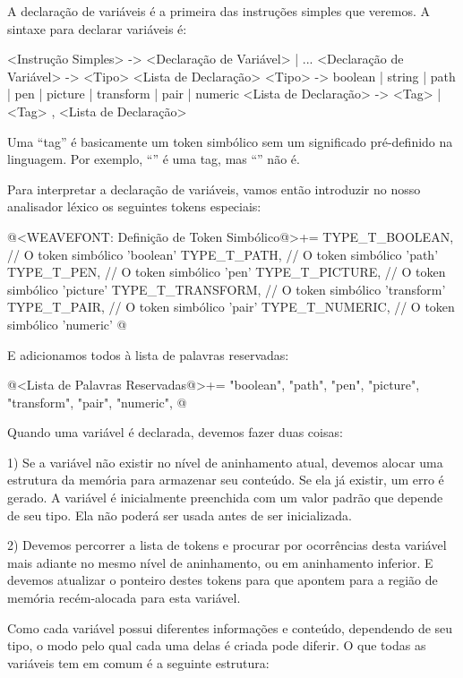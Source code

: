 
A declaração de variáveis é a primeira das instruções simples que
veremos. A sintaxe para declarar variáveis é:

\alinhaverbatim
<Instrução Simples> -> <Declaração de Variável> | ...
<Declaração de Variável> -> <Tipo> <Lista de Declaração>
<Tipo> -> boolean | string | path | pen | picture | transform | pair |
          numeric
<Lista de Declaração> -> <Tag> | <Tag> , <Lista de Declaração>
\alinhanormal

Uma ``tag'' é basicamente um token simbólico sem um significado
pré-definido na linguagem. Por exemplo, ``'' é uma tag,
mas ``'' não é.

Para interpretar a declaração de variáveis, vamos então introduzir no
nosso analisador léxico os seguintes tokens especiais:

\iniciocodigo
@<WEAVEFONT: Definição de Token Simbólico@>+=
TYPE_T_BOOLEAN,               // O token simbólico 'boolean'
TYPE_T_PATH,                  // O token simbólico 'path'
TYPE_T_PEN,                   // O token simbólico 'pen'
TYPE_T_PICTURE,               // O token simbólico 'picture'
TYPE_T_TRANSFORM,             // O token simbólico 'transform'
TYPE_T_PAIR,                  // O token simbólico 'pair'
TYPE_T_NUMERIC,               // O token simbólico 'numeric'
@
\fimcodigo

E adicionamos todos à lista de palavras reservadas:

\iniciocodigo
@<Lista de Palavras Reservadas@>+=
"boolean", "path", "pen", "picture", "transform", "pair", "numeric",
@
\fimcodigo

Quando uma variável é declarada, devemos fazer duas coisas:

1) Se a variável não existir no nível de aninhamento atual, devemos
alocar uma estrutura da memória para armazenar seu conteúdo. Se ela já
existir, um erro é gerado. A variável é inicialmente preenchida com um
valor padrão que depende de seu tipo. Ela não poderá ser usada antes
de ser inicializada.

2) Devemos percorrer a lista de tokens e procurar por ocorrências
desta variável mais adiante no mesmo nível de aninhamento, ou em
aninhamento inferior. E devemos atualizar o ponteiro destes tokens
para que apontem para a região de memória recém-alocada para esta
variável.

Como cada variável possui diferentes informações e conteúdo,
dependendo de seu tipo, o modo pelo qual cada uma delas é criada pode
diferir. O que todas as variáveis tem em comum é a seguinte estrutura:


